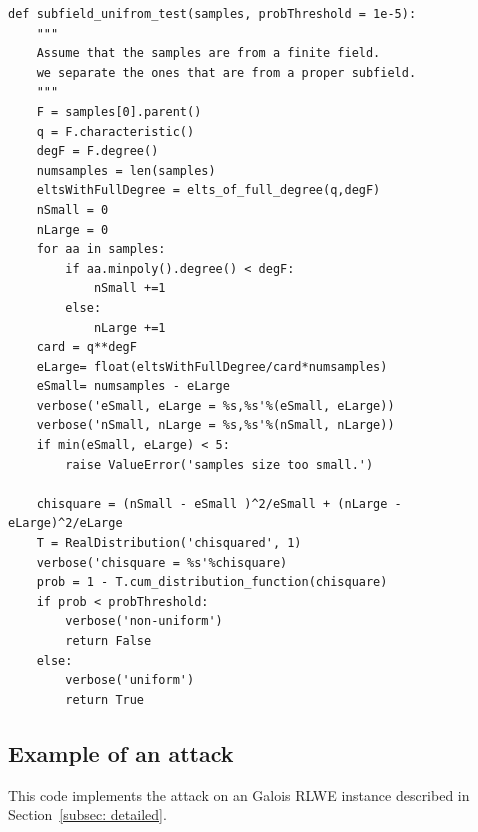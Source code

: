 \documentclass[envcountsame]{llncs}
\begin{document}
\scriptsize
\begin{verbatim}
def subfield_unifrom_test(samples, probThreshold = 1e-5):
    """
    Assume that the samples are from a finite field.
    we separate the ones that are from a proper subfield.
    """
    F = samples[0].parent()
    q = F.characteristic()
    degF = F.degree()
    numsamples = len(samples)
    eltsWithFullDegree = elts_of_full_degree(q,degF)
    nSmall = 0
    nLarge = 0
    for aa in samples:
        if aa.minpoly().degree() < degF:
            nSmall +=1
        else:
            nLarge +=1
    card = q**degF
    eLarge= float(eltsWithFullDegree/card*numsamples)
    eSmall= numsamples - eLarge
    verbose('eSmall, eLarge = %s,%s'%(eSmall, eLarge))
    verbose('nSmall, nLarge = %s,%s'%(nSmall, nLarge))
    if min(eSmall, eLarge) < 5:
        raise ValueError('samples size too small.')

    chisquare = (nSmall - eSmall )^2/eSmall + (nLarge - eLarge)^2/eLarge
    T = RealDistribution('chisquared', 1)
    verbose('chisquare = %s'%chisquare)
    prob = 1 - T.cum_distribution_function(chisquare)
    if prob < probThreshold:
        verbose('non-uniform')
        return False
    else:
        verbose('uniform')
        return True
\end{verbatim}

\subsection{Example of an attack}
\label{subsec: code}

\normalsize
This code implements the attack on an Galois RLWE instance described in Section~\ref{subsec: detailed}.
\end{document}
